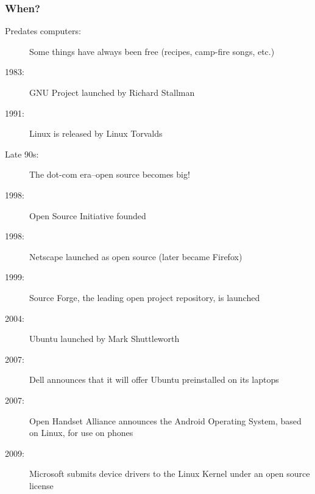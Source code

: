 \documentclass{beamer}
\begin{document}
\begin{frame}
  \frametitle{When?}

  \begin{description}
  \item[Predates computers:] Some things have always been free (recipes, camp-fire songs, etc.)
  \item[1983:] GNU Project launched by Richard Stallman
  \item[1991:] Linux is released by Linux Torvalds
  \item[Late 90s:] The dot-com era--open source becomes big!
  \item[1998:] Open Source Initiative founded
  \item[1998:] Netscape launched as open source (later became Firefox)
  \item[1999:] Source Forge, the leading open project repository, is launched
  \item[2004:] Ubuntu launched by Mark Shuttleworth
  \item[2007:] Dell announces that it will offer Ubuntu preinstalled on its laptops
  \item[2007:] Open Handset Alliance announces the Android Operating System, based on Linux, for use on phones
  \item[2009:] Microsoft submits device drivers to the Linux Kernel under an open source license
  \end{description}
\end{frame}
\end{document}
